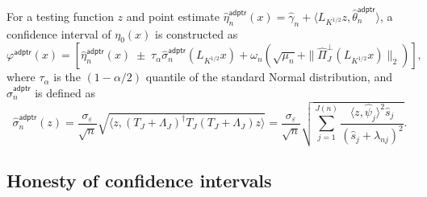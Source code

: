 \documentclass[aos]{imsart}
\renewcommand{\hat}{\widehat}
\newcommand{\adptr}{\mathsf{adptr}}
\theoremstyle{plain}
\theoremstyle{definition}
\theoremstyle{definition}
\begin{document}
For a testing function $z$ and point estimate $\hat\eta_n^\adptr(x)=\hat\gamma_n+\langle L_{K^{1/2}}z,\hat\theta_n^\adptr\rangle$, a confidence interval of $\eta_0(x)$ is constructed as
$$
\varphi^\adptr(x) = [\hat\eta_n^\adptr(x)\;\pm\;\tau_{\alpha}\hat\sigma_n^\adptr(L_{K^{1/2}}x)+\omega_n(\sqrt{\mu_n}+\|\hat\Pi_J^\perp(L_{K^{1/2}}x)\|_2)],
$$
where $\tau_{\alpha}$ is the $(1-\alpha/2)$ quantile of the standard Normal distribution, and $\hat\sigma_n^\adptr$ is defined as
$$
\hat\sigma_n^\adptr(z) =  \frac{\sigma_\varepsilon}{\sqrt{n}}\sqrt{\langle z, (T_J+\Lambda_J)^\dagger T_J(T_J+\Lambda_J)z\rangle} = \frac{\sigma_\varepsilon}{\sqrt{n}}\sqrt{\sum_{j=1}^{J(n)}\frac{\langle z,\hat\psi_j\rangle^2\hat s_j}{(\hat s_j+\lambda_{nj})^2}}.
$$

\subsection{Honesty of confidence intervals}
\end{document}
